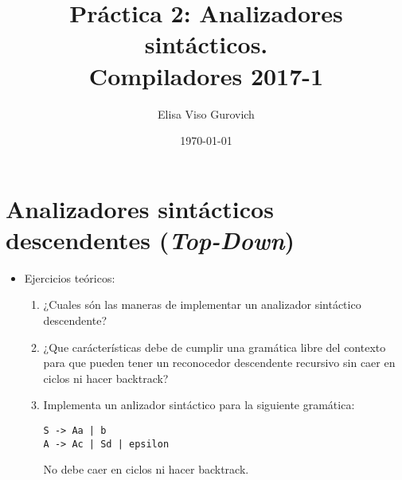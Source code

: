 \documentclass[11pt]{article}
\author{Elisa Viso Gurovich}
\date{\today}
\title{Práctica 2: Analizadores sintácticos.\\\medskip
\large Compiladores 2017-1}
\begin{document}
\maketitle

\section{Analizadores sintácticos descendentes (\emph{Top-Down})}
\label{sec:orgheadline1}
\begin{itemize}
\item Ejercicios teóricos:
\begin{enumerate}
\item ¿Cuales són las maneras de implementar un analizador sintáctico descendente?
\item ¿Que carácterísticas debe de cumplir una gramática libre del contexto para
que pueden tener un reconocedor descendente recursivo sin caer en ciclos 
ni hacer backtrack?
\item Implementa un anlizador sintáctico para la siguiente gramática:
\begin{verbatim}
S -> Aa | b
A -> Ac | Sd | epsilon
\end{verbatim}
No debe caer en ciclos ni hacer backtrack.
\end{enumerate}
\end{itemize}
\end{document}
